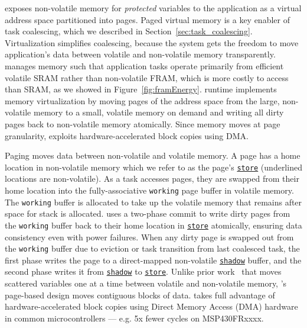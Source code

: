 \sys exposes non-volatile memory for \emph{protected} variables to
the application as a virtual address space partitioned into pages.
Paged virtual memory is a key enabler of task coalescing, which
we described in Section~\ref{sec:task_coalescing}. Virtualization simplifies
coalescing, because the system gets the freedom to move application's data
between volatile and non-volatile memory transparently.
%
\sys manages memory such that application tasks operate primarily from
efficient volatile SRAM rather than non-volatile FRAM, which is more costly to access than SRAM,
as we showed in Figure~\ref{fig:framEnergy}. \sys runtime implements memory
virtualization by moving pages of the address space from the large,
non-volatile memory to a small, volatile memory on demand and writing all dirty
pages back to non-volatile memory atomically. Since memory moves at page granularity, \sys
exploits hardware\hyp{}accelerated block copies using DMA.


Paging moves data between non-volatile and volatile memory. A page has a home location in non-volatile memory which we refer to as the page's \texttt{\underline{store}} (underlined locations are non-volatile).
As a task accesses pages, they are swapped from their home location
into the fully\hyp{}associative \texttt{working} page buffer in volatile memory. The \texttt{working} buffer is allocated to take up the volatile memory that remains after space for stack is allocated.
%
\sys uses a two-phase commit to write dirty pages from the \texttt{working} buffer back to their home location in \texttt{\underline{store}} atomically, ensuring data consistency even with power failures.
%
When any dirty page is swapped out from the \texttt{working} buffer due to eviction or task transition from last coalesced task, the first phase writes the page to a direct\hyp{}mapped non-volatile \texttt{\underline{shadow}} buffer, and the second phase writes it from \texttt{\underline{shadow}} to \texttt{\underline{store}}.
%
Unlike prior work~\cite{chain,alpaca} that moves scattered variables one at a time between volatile and non-volatile memory, \sys's page-based design moves contiguous blocks of data.
%
\sys takes full advantage of hardware\hyp{}accelerated block copies using Direct Memory Access (DMA) hardware in common microcontrollers --- e.g. 5x fewer cycles on MSP430FRxxxx.

